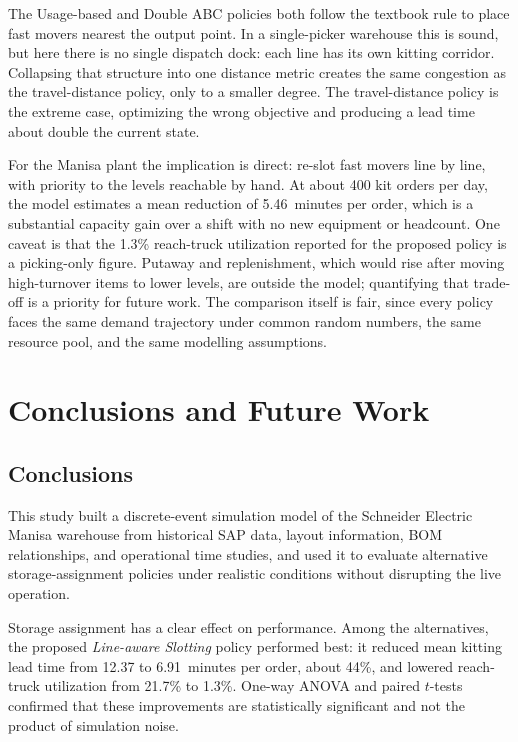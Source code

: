 \documentclass[conference]{IEEEtran}
\newcommand{\policy}[1]{\textit{#1}}
\begin{document}
The Usage-based and Double ABC policies both follow the textbook rule to place
fast movers nearest the output point. In a single-picker warehouse this is
sound, but here there is no single dispatch dock: each line has its own
kitting corridor. Collapsing that structure into one distance metric creates
the same congestion as the travel-distance policy, only to a smaller degree.
The travel-distance policy is the extreme case, optimizing the wrong objective
and producing a lead time about double the current state.

For the Manisa plant the implication is direct: re-slot fast movers line by
line, with priority to the levels reachable by hand. At about 400 kit orders
per day, the model estimates a mean reduction of 5.46~minutes per order, which
is a substantial capacity gain over a shift with no new equipment or
headcount. One caveat is that the 1.3\% reach-truck utilization reported for
the proposed policy is a picking-only figure. Putaway and replenishment, which
would rise after moving high-turnover items to lower levels, are outside the
model; quantifying that trade-off is a priority for future work. The
comparison itself is fair, since every policy faces the same demand
trajectory under common random numbers, the same resource pool, and the same
modelling assumptions.

\section{Conclusions and Future Work}
\subsection{Conclusions}
This study built a discrete-event simulation model of the Schneider Electric
Manisa warehouse from historical SAP data, layout information, BOM
relationships, and operational time studies, and used it to evaluate
alternative storage-assignment policies under realistic conditions without
disrupting the live operation.

Storage assignment has a clear effect on performance. Among the alternatives,
the proposed \policy{Line-aware Slotting} policy performed best: it reduced
mean kitting lead time from 12.37 to 6.91~minutes per order, about 44\%, and
lowered reach-truck utilization from 21.7\% to 1.3\%. One-way ANOVA and paired
$t$-tests confirmed that these improvements are statistically significant and
not the product of simulation noise.
\end{document}
